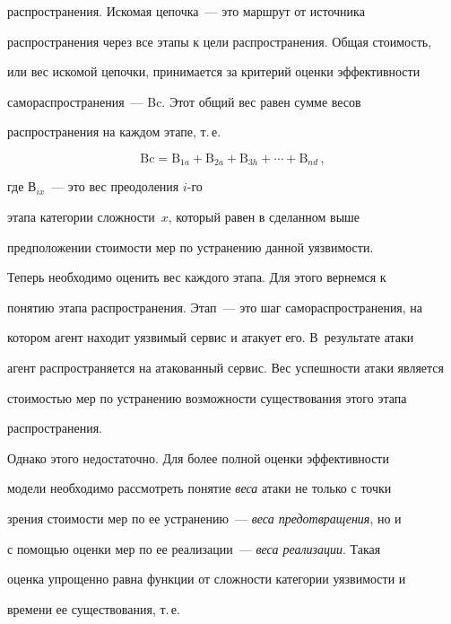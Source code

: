 распространения. Искомая цепочка~--- это маршрут от источника 


распространения через все этапы к цели распространения. Общая стоимость, 


или вес искомой цепочки, принимается за критерий оценки эффективности 


самораспространения~--- Bc. Этот общий вес равен сумме весов 


распространения на каждом этапе, т.\,е. 


$$


\mathrm{Bc}=  \mathrm{B}_{1a}+\mathrm{B}_{2a}+\mathrm{B}_{3h}+\cdots +\mathrm{B}_{nd}\,,


$$ 


где В$_{ix}$~--- это вес преодоления $i$-го 


этапа категории сложности~$x$, который равен в сделанном выше 


предположении стоимости мер по устранению данной уязвимости.


     


     Теперь необходимо оценить вес каждого этапа. Для этого вернемся к 


понятию этапа распространения. Этап~--- это шаг самораспространения, на 


котором агент находит уязвимый сервис и атакует его. В~результате атаки 


агент распространяется на атакованный сервис. Вес успешности атаки является 


стоимостью мер по устранению возможности существования этого этапа 


распространения. 


     


     Однако этого недостаточно. Для более полной оценки эффективности 


модели необходимо рассмотреть понятие \textit{веса} атаки не только с точки 


зрения стоимости мер по ее устранению~--- \textit{веса предотвращения}, но и 


с помощью оценки мер по ее реализации~--- \textit{веса реализации}. Такая 


оценка упрощенно равна функции от сложности категории уязвимости и 


времени ее существования, т.\,е. 





\vspace*{3pt}





